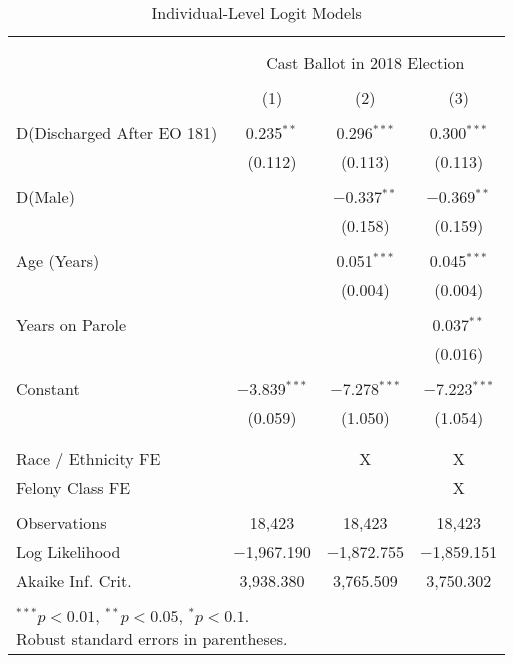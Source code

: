 \documentclass[
  12pt,
]{article}
\begin{document}
\begin{singlespace}
\begin{table}[H] \centering
\fontsize{10}{12}\selectfont
\caption{\label{tab:to-18-logit} Individual-Level Logit Models}
\label{}
\begin{tabular}{@{\extracolsep{5pt}}lccc}
\\[-1.8ex]\hline \\[-1.8ex]
\\[-1.8ex] & \multicolumn{3}{c}{Cast Ballot in 2018 Election} \\
\\[-1.8ex] & (1) & (2) & (3)\\
\hline \\[-1.8ex]
D(Discharged After EO 181) & 0.235$^{**}$ & 0.296$^{***}$ & 0.300$^{***}$ \\
& (0.112) & (0.113) & (0.113) \\
& & & \\
D(Male) &  & $-$0.337$^{**}$ & $-$0.369$^{**}$ \\
&  & (0.158) & (0.159) \\
& & & \\
Age (Years) &  & 0.051$^{***}$ & 0.045$^{***}$ \\
&  & (0.004) & (0.004) \\
& & & \\
Years on Parole &  &  & 0.037$^{**}$ \\
&  &  & (0.016) \\
& & & \\
Constant & $-$3.839$^{***}$ & $-$7.278$^{***}$ & $-$7.223$^{***}$ \\
& (0.059) & (1.050) & (1.054) \\
& & & \\
\hline \\[-1.8ex]
Race / Ethnicity FE &  & X & X \\
Felony Class FE &  &  & X \\
\hline \\[-1.8ex]
Observations & 18,423 & 18,423 & 18,423 \\
Log Likelihood & $-$1,967.190 & $-$1,872.755 & $-$1,859.151 \\
Akaike Inf. Crit. & 3,938.380 & 3,765.509 & 3,750.302 \\
\hline \\[-1.8ex]
\multicolumn{4}{l}{\scriptsize{\parbox{.5\linewidth}{\vspace{2pt}$^{***}p<0.01$, $^{**}p<0.05$, $^*p<0.1$. \\Robust standard errors in parentheses.}}}
\end{tabular}
\end{table}

\end{singlespace}
\end{document}
